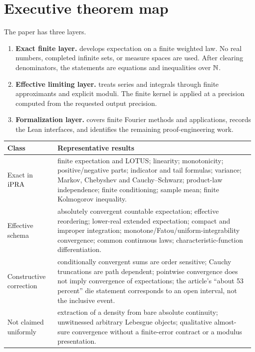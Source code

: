 \tableofcontents
\newpage

\section*{Executive theorem map}

The paper has three layers.

\begin{enumerate}
\item \textbf{Exact finite layer.}  
  develops expectation on a finite weighted law.  No real numbers, completed
  infinite sets, or measure spaces are used.  After clearing denominators, the
  statements are equations and inequalities over \(\mathbb N\).
\item \textbf{Effective limiting layer.}  
  treats series and integrals through finite approximants and explicit moduli.
  The finite kernel is applied at a precision computed from the requested output
  precision.
\item \textbf{Formalization layer.}  
  covers finite Fourier methods and applications, records the Lean interfaces,
  and identifies the remaining proof-engineering work.
\end{enumerate}

\begin{center}
\begin{tabular}{@{}p{}p{}@{}}
\toprule
Class & Representative results \\
\midrule
Exact in \(\mathrm{iPRA}\) & finite expectation and LOTUS; linearity; monotonicity;
positive/negative parts; indicator and tail formulas; variance; Markov,
Chebyshev and Cauchy--Schwarz; product-law independence; finite conditioning;
sample mean; finite Kolmogorov inequality. \\
Effective schema & absolutely convergent countable expectation; effective
reordering; lower-real extended expectation; compact and improper integration;
monotone/Fatou/uniform-integrability convergence; common continuous laws;
characteristic-function differentiation. \\
Constructive correction & conditionally convergent sums are order sensitive;
Cauchy truncations are path dependent; pointwise convergence does not imply
convergence of expectations; the article's ``about 53 percent'' die statement
corresponds to an open interval, not the inclusive event. \\
Not claimed uniformly & extraction of a density from bare absolute continuity;
unwitnessed arbitrary Lebesgue objects; qualitative almost-sure convergence
without a finite-error contract or a modulus presentation. \\
\bottomrule
\end{tabular}
\end{center}
